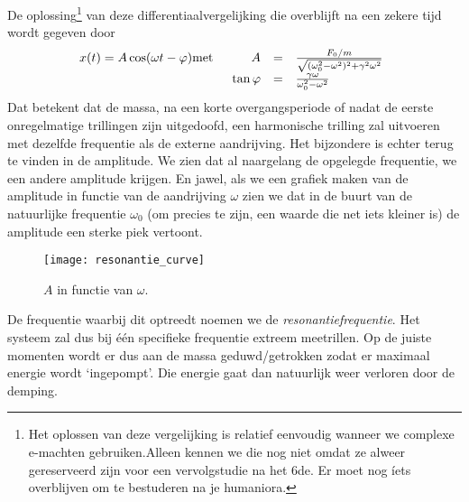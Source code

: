 \documentclass{ximera}
\begin{document}
	De oplossing\footnote{Het oplossen van deze vergelijking is relatief eenvoudig wanneer we complexe e-machten gebruiken.\footnotemark Alleen kennen we die nog niet omdat ze alweer gereserveerd zijn voor een vervolgstudie na het 6de. Er moet nog \'iets overblijven om te bestuderen na je humaniora.} van deze differentiaalvergelijking die overblijft na een zekere tijd wordt gegeven door
	\begin{eqnarray*}
	x(t)=A\cos(\omega t-\varphi)&\mathrm{met}&
	\begin{array}[t]{rcl}
	\displaystyle A&=&\frac{F_0/m}{\sqrt{(\omega_0^2-\omega^2)^2+\gamma^2\omega^2}}\\
	\displaystyle\tan\varphi&=&\frac{\gamma\omega}{\omega_0^2-\omega^2}
	\end{array}
	\end{eqnarray*}
	Dat betekent dat de massa, na een korte overgangsperiode of nadat de eerste onregelmatige trillingen zijn uitgedoofd, een harmonische trilling zal uitvoeren met dezelfde frequentie als de externe aandrijving. Het bijzondere is echter terug te vinden in de amplitude. We zien dat al naargelang de opgelegde frequentie, we een andere amplitude krijgen. En jawel, als we een grafiek maken van de amplitude in functie van de aandrijving $\omega$ zien we dat in de buurt van de natuurlijke frequentie $\omega_0$ (om precies te zijn, een waarde die net iets kleiner is) de amplitude een sterke piek vertoont. 
	\begin{figure}[h]
	\centering
	\texttt{[image: resonantie\_curve]}
	\caption{$A$ in functie van $\omega$.}
	\end{figure}
	De frequentie waarbij dit optreedt noemen we de \emph{resonantiefrequentie}. Het systeem zal dus bij \'e\'en specifieke frequentie extreem meetrillen. Op de juiste momenten wordt er dus aan de massa geduwd/getrokken zodat er maximaal energie wordt `ingepompt'. Die energie gaat dan natuurlijk weer verloren door de demping.
	
\end{document}
